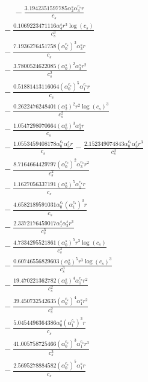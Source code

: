 \documentclass[10pt]{article}
\begin{document}
\begin{align*}
\phantom{R_{2,8}} &\phantom{={}}{}  - \frac{3.1942351597785 \alpha_{2}^s \alpha_{3}^{c_s} r}{c_{s}} \\
&{}  - \frac{0.1069223471116 \alpha_{4}^s r^{3} \log{\left(c_{s} \right)}}{c_{s}^{3}} \\
&{}  - \frac{7.1936276451758 \left(\alpha_{0}^{c_s}\right)^{3} \alpha_{3}^s r}{c_{s}} \\
&{}  - \frac{3.7800524622085 \left(\alpha_{0}^s\right)^{2} \alpha_{3}^s r^{2}}{c_{s}^{2}} \\
&{}  - \frac{0.51881413116064 \left(\alpha_{0}^{c_s}\right)^{5} \alpha_{1}^{c_s} r}{c_{s}} \\
&{}  - \frac{0.2622476248401 \left(\alpha_{2}^s\right)^{2} r^{2} \log{\left(c_{s} \right)}^{3}}{c_{s}^{2}} \\
&{}  - \frac{1.0547298070664 \left(\alpha_{0}^s\right)^{3} \alpha_{3}^s r}{c_{s}} \\
&{}  - \frac{1.0553459408178 \alpha_{0}^{c_s} \alpha_{5}^s r}{c_{s}} - \frac{2.152349074843 \alpha_{0}^{c_s} \alpha_{3}^s r^{3}}{c_{s}^{3}} \\
&{}  - \frac{8.7164664429797 \left(\alpha_{0}^{c_s}\right)^{2} \alpha_{3}^{c_s} r^{2}}{c_{s}^{2}} \\
&{}  - \frac{1.1627056337191 \left(\alpha_{0}^s\right)^{5} \alpha_{1}^{c_s} r}{c_{s}} \\
&{}  - \frac{4.6582189591031 \alpha_{0}^{c_s} \left(\alpha_{1}^{c_s}\right)^{3} r}{c_{s}} \\
&{}  - \frac{2.3372176459017 \alpha_{1}^s \alpha_{2}^s r^{3}}{c_{s}^{3}} \\
&{}  - \frac{4.7334295521861 \left(\alpha_{0}^s\right)^{5} r^{3} \log{\left(c_{s} \right)}}{c_{s}^{3}} \\
&{}  - \frac{0.60746556829603 \left(\alpha_{0}^s\right)^{5} r^{3} \log{\left(c_{s} \right)}^{3}}{c_{s}^{3}} \\
&{}  - \frac{19.470221362782 \left(\alpha_{0}^s\right)^{4} \alpha_{1}^{c_s} r^{2}}{c_{s}^{2}} \\
&{}  - \frac{39.450732542635 \left(\alpha_{0}^{c_s}\right)^{4} \alpha_{1}^s r^{2}}{c_{s}^{2}} \\
&{}  - \frac{5.0454496364386 \alpha_{0}^s \left(\alpha_{1}^{c_s}\right)^{3} r}{c_{s}} \\
&{}  - \frac{41.005758725466 \left(\alpha_{0}^{c_s}\right)^{3} \alpha_{1}^{c_s} r^{3}}{c_{s}^{3}} \\
&{}  - \frac{2.5695278884582 \left(\alpha_{0}^{c_s}\right)^{5} \alpha_{1}^s r}{c_{s}} \\

\end{align*}
\end{document}
